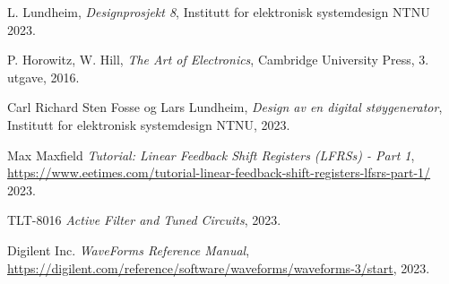 
  L. Lundheim,
  \emph{Designprosjekt 8},
  Institutt for elektronisk systemdesign NTNU
  2023.

  P. Horowitz, W. Hill,
  \emph{The Art of Electronics},
  Cambridge University Press,
  3. utgave,
  2016.

  Carl Richard Sten Fosse og Lars Lundheim,
  \emph{Design av en digital støygenerator},
  Institutt for elektronisk systemdesign NTNU,
  2023.

  Max Maxfield 
  \emph{Tutorial: Linear Feedback Shift Registers (LFRSs) - Part 1},
  \url{https://www.eetimes.com/tutorial-linear-feedback-shift-registers-lfsrs-part-1/}
  2023.

  TLT-8016
  \emph{Active Filter and Tuned Circuits},
  2023.

  Digilent Inc.
  \emph{WaveForms Reference Manual},
  \url{https://digilent.com/reference/software/waveforms/waveforms-3/start},
  2023.